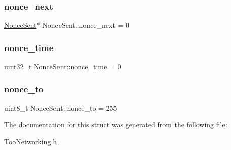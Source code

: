 \subsubsection{\texorpdfstring{nonce\+\_\+next}{nonce\_next}}
{\footnotesize\ttfamily \hyperlink{structNonceSent}{Nonce\+Sent}$\ast$ Nonce\+Sent\+::nonce\+\_\+next = 0}

\mbox{\label{structNonceSent_a346064c4a1c6f06a0563f8dec5446d05}} 
\subsubsection{\texorpdfstring{nonce\+\_\+time}{nonce\_time}}
{\footnotesize\ttfamily uint32\+\_\+t Nonce\+Sent\+::nonce\+\_\+time = 0}

\mbox{\label{structNonceSent_ad5484888a11a0c041610c38b564c5627}} 
\subsubsection{\texorpdfstring{nonce\+\_\+to}{nonce\_to}}
{\footnotesize\ttfamily uint8\+\_\+t Nonce\+Sent\+::nonce\+\_\+to = 255}



The documentation for this struct was generated from the following file\+:\begin{DoxyCompactItemize}
\item 
\hyperlink{TooNetworking_8h}{Too\+Networking.\+h}\end{DoxyCompactItemize}
